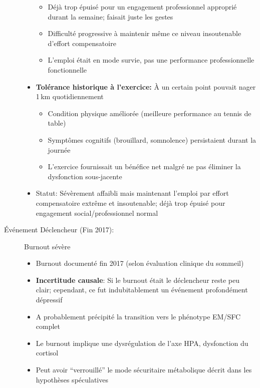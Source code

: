 \begin{description}
\begin{itemize}
\begin{itemize}
            \item Déjà trop épuisé pour un engagement professionnel approprié durant la semaine; faisait juste les gestes
            \item Difficulté progressive à maintenir même ce niveau insoutenable d'effort compensatoire
            \item L'emploi était en mode survie, pas une performance professionnelle fonctionnelle
        \end{itemize}
        \item \textbf{Tolérance historique à l'exercice:} À un certain point pouvait nager 1\,km quotidiennement
        \begin{itemize}
            \item Condition physique améliorée (meilleure performance au tennis de table)
            \item Symptômes cognitifs (brouillard, somnolence) persistaient durant la journée
            \item L'exercice fournissait un bénéfice net malgré ne pas éliminer la dysfonction sous-jacente
        \end{itemize}
        \item Statut: Sévèrement affaibli mais maintenant l'emploi par effort compensatoire extrême et insoutenable; déjà trop épuisé pour engagement social/professionnel normal
    \end{itemize}

    \item[Événement Déclencheur (Fin 2017):] Burnout sévère
    \begin{itemize}
        \item Burnout documenté fin 2017 (selon évaluation clinique du sommeil)
        \item \textbf{Incertitude causale}: Si le burnout était le déclencheur reste peu clair; cependant, ce fut indubitablement un événement profondément dépressif
        \item A probablement précipité la transition vers le phénotype EM/SFC complet
        \item Le burnout implique une dysrégulation de l'axe HPA, dysfonction du cortisol
        \item Peut avoir ``verrouillé'' le mode sécuritaire métabolique décrit dans les hypothèses spéculatives
    \end{itemize}


\end{description}
